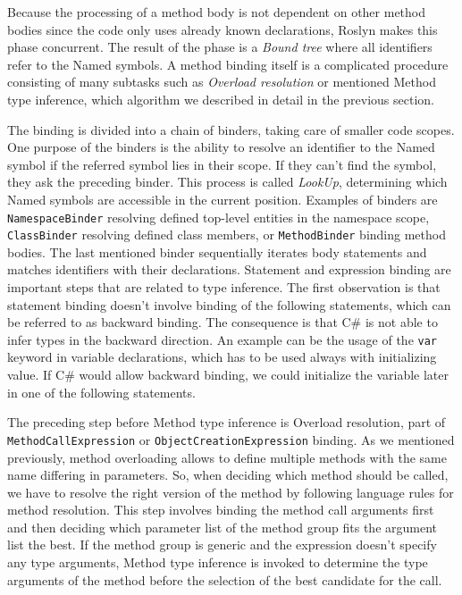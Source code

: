 Because the processing of a method body is not dependent on other method bodies since the code only uses already known declarations, Roslyn makes this phase concurrent. 
The result of the phase is a \emph{Bound tree} where all identifiers refer to the Named symbols. 
A method binding itself is a complicated procedure consisting of many subtasks such as \emph{Overload resolution} or mentioned Method type inference, which algorithm we described in detail in the previous section.
\par
{}
The binding is divided into a chain of binders, taking care of smaller code scopes. 
One purpose of the binders is the ability to resolve an identifier to the Named symbol if the referred symbol lies in their scope. 
If they can’t find the symbol, they ask the preceding binder. 
This process is called \emph{LookUp}, determining which Named symbols are accessible in the current position. 
Examples of binders are \texttt{NamespaceBinder} resolving defined top-level entities in the namespace scope, \texttt{ClassBinder} resolving defined class members, or \texttt{MethodBinder} binding method bodies. 
The last mentioned binder sequentially iterates body statements and matches identifiers with their declarations. 
Statement and expression binding are important steps that are related to type inference. 
The first observation is that statement binding doesn’t involve binding of the following statements, which can be referred to as backward binding. 
The consequence is that C\# is not able to infer types in the backward direction. 
An example can be the usage of the \texttt{var} keyword in variable declarations, which has to be used always with initializing value. 
If C\# would allow backward binding, we could initialize the variable later in one of the following statements.
\par
{}
The preceding step before Method type inference is Overload resolution, part of \texttt{MethodCallExpression} or \texttt{ObjectCreationExpression} binding. 
As we mentioned previously, method overloading allows to define multiple methods with the same name differing in parameters. 
So, when deciding which method should be called, we have to resolve the right version of the method by following language rules for method resolution. 
This step involves binding the method call arguments first and then deciding which parameter list of the method group fits the argument list the best. 
If the method group is generic and the expression doesn’t specify any type arguments, Method type inference is invoked to determine the type arguments of the method before the selection of the best candidate for the call.
